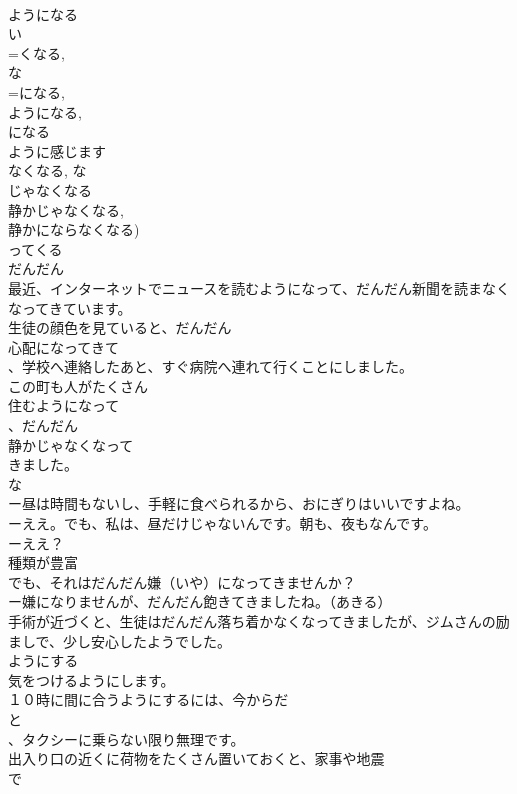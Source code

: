 \documentclass[8pt]{extreport}
\begin{document}
\begin{CJK}{UTF8}{min}
\\	ようになる
\\	い
\\	=くなる,
\\	な
\\	=になる, 
\\	ようになる, 
\\	になる
\\	ように感じます　
\\	なくなる, な
\\	じゃなくなる 
\\	静かじゃなくなる, 
\\	静かにならなくなる)
\\	ってくる 
\\	だんだん 
\\	最近、インターネットでニュースを読むようになって、だんだん新聞を読まなくなってきています。
\\	生徒の顔色を見ていると、だんだん
\\	心配になってきて
\\	、学校へ連絡したあと、すぐ病院へ連れて行くことにしました。　
\\	この町も人がたくさん
\\	住むようになって
\\	、だんだん
\\	静かじゃなくなって
\\	きました。
\\	な
\\	ー昼は時間もないし、手軽に食べられるから、おにぎりはいいですよね。
\\	ーええ。でも、私は、昼だけじゃないんです。朝も、夜もなんです。
\\	ーええ？
\\	種類が豊富
\\	でも、それはだんだん嫌（いや）になってきませんか？
\\	ー嫌になりませんが、だんだん飽きてきましたね。（あきる）
\\	手術が近づくと、生徒はだんだん落ち着かなくなってきましたが、ジムさんの励ましで、少し安心したようでした。
\\	ようにする
\\	気をつけるようにします。
\\	１０時に間に合うようにするには、今からだ
\\	と
\\	、タクシーに乗らない限り無理です。
\\	出入り口の近くに荷物をたくさん置いておくと、家事や地震
\\	で

\end{CJK}
\end{document}
